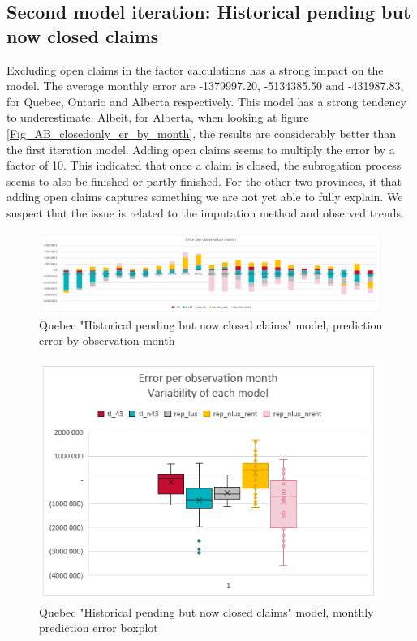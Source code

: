 \subsection{Second model iteration: Historical pending but now closed claims}
	Excluding open claims in the factor calculations has a strong impact on the model. The average monthly error are -1379997.20, -5134385.50 and -431987.83, for Quebec, Ontario and Alberta respectively. This model has a strong tendency to underestimate. Albeit, for Alberta, when looking at figure \ref{Fig_AB_closedonly_er_by_month}, the results are considerably better than the first iteration model. Adding open claims seems to multiply the error by a factor of 10. This indicated that once a claim is closed, the subrogation process seems to also be finished or partly finished. For the other two provinces, it that adding open claims captures something we are not yet able to fully explain. We suspect that the issue is related to the imputation method and observed trends.
		\begin{figure}[H]
			\begin{center}
				\includegraphics[scale=0.4]{Graphiques/QC_closedonly_model_by_month} 
				\renewcommand{\figurename}{Figure}
				\caption{Quebec "Historical  pending but now closed claims" model, prediction error by observation month}\label{Fig_QC_closedonly_er_by_month}
			\end{center}
		\end{figure}
		\begin{figure}[H]
			\begin{center}
				\includegraphics[scale=0.4]{Graphiques/QC_closedonly_model_mustach} 
				\renewcommand{\figurename}{Figure}
				\caption{Quebec "Historical  pending but now closed claims" model, monthly prediction error boxplot}\label{Fig_QC_closedonly_er_boxplot}
			\end{center}
		\end{figure}

